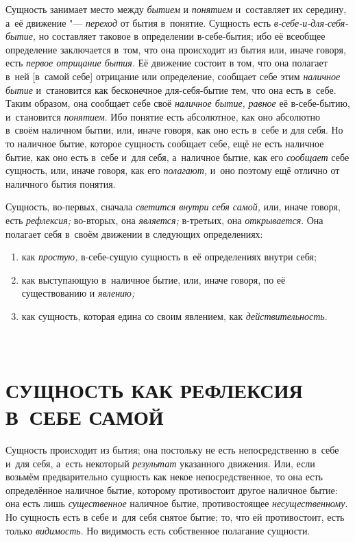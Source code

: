 Сущность занимает место между {\em бытием} и
{\em понятием} и~составляет их середину, а~её движение
"--- {\em переход} от бытия в~понятие. Сущность есть
{\em в-себе-и-для-себя-бытие,} но составляет таковое в
определении в-себе-бытия; ибо её всеобщее определение заключается в~том,
что она происходит из бытия или, иначе говоря, есть
{\em первое отрицание бытия}. Её движение состоит в
том, что она полагает в~ней [в~самой себе] отрицание или определение,
сообщает себе этим {\em наличное бытие} и~становится
как бесконечное для-себя-бытие тем, что она есть в~себе. Таким образом, она
сообщает себе своё {\em наличное бытие,}
{\em равное} её в-себе-бытию, и~становится
{\em понятием}. Ибо понятие есть абсолютное, как оно
абсолютно в~своём наличном бытии, или, иначе говоря, как оно есть в~себе и
для себя. Но то наличное бытие, которое сущность сообщает себе, ещё не есть
наличное бытие, как оно есть в~себе и~для себя, а~наличное бытие, как его
{\em сообщает} себе сущность, или, иначе говоря, как
его {\em полагают,} и~оно поэтому ещё отлично от
наличного бытия понятия.

Сущность, во-первых, сначала {\em светится внутри себя
самой,} или, иначе говоря, есть {\em рефлексия;}
во-вторых, она {\em является;} в-третьих, она
{\em открывается}. Она полагает себя в~своём движении в
следующих определениях:
\begin{enumerate}[~~~~I.]
\item как {\em простую,} в-себе-сущую сущность в~её определениях внутри себя;
\item как выступающую в~наличное бытие, или, иначе
  говоря, по её существованию и {\em явлению;}
\item как сущность, которая едина со своим
  явлением, как {\em действительность}.
\end{enumerate}

\clearpage


\part[\small СУЩНОСТЬ КАК РЕФЛЕКСИЯ В~СЕБЕ САМОЙ]%
     {\fontsize{9}{11}\selectfont{\mdseries ПЕРВЫЙ ОТДЕЛ}\\%
      \normalsize СУЩНОСТЬ КАК РЕФЛЕКСИЯ В~СЕБЕ САМОЙ}

Сущность происходит из бытия; она постольку не
есть непосредственно в~себе и~для себя, а~есть некоторый
{\em результат} указанного движения. Или, если возьмём
предварительно сущность как некое непосредственное, то она есть
определённое наличное бытие, которому противостоит другое наличное бытие:
она есть лишь {\em существенное} наличное бытие,
противостоящее {\em несущественному}. Но сущность есть
в себе и~для себя снятое бытие; то, что ей противостоит, есть только
{\em видимость}. Но видимость есть собственное полагание сущности.

